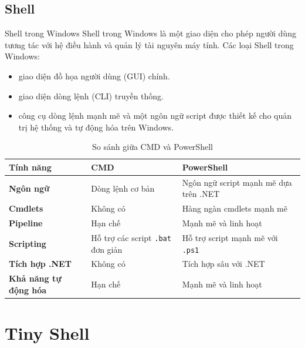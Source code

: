 \subsection{Shell}

\begin{frame}{Shell trong Windows}
Shell trong Windows là một giao diện cho phép người dùng tương tác với hệ điều hành và quản lý tài nguyên máy tính.
\vspace{5 pt}
Các loại Shell trong Windows:
\begin{itemize}
    \item {} giao diện đồ họa người dùng (GUI) chính.
    \item {} giao diện dòng lệnh (CLI) truyền thống.
    \item {} công cụ dòng lệnh mạnh mẽ và một ngôn ngữ script được thiết kế cho quản trị hệ thống và tự động hóa trên Windows. 
\end{itemize}
\end{frame}

\begin{frame}
\begin{table}[h]
\centering
\begin{tabular}{|>{\raggedright}m{2cm}|>{\raggedright\arraybackslash}m{3cm}|>{\raggedright\arraybackslash}m{3.5cm}|}
\hline
\textbf{Tính năng} & \textbf{CMD} & \textbf{PowerShell} \\ \hline
\textbf{Ngôn ngữ} & Dòng lệnh cơ bản & Ngôn ngữ script mạnh mẽ dựa trên .NET \\ \hline
\textbf{Cmdlets} & Không có & Hàng ngàn cmdlets mạnh mẽ \\ \hline
\textbf{Pipeline} & Hạn chế & Mạnh mẽ và linh hoạt \\ \hline
\textbf{Scripting} & Hỗ trợ các script \texttt{.bat} đơn giản & Hỗ trợ script mạnh mẽ với \texttt{.ps1} \\ \hline
\textbf{Tích hợp .NET} & Không có & Tích hợp sâu với .NET \\ \hline
\textbf{Khả năng tự động hóa} & Hạn chế & Mạnh mẽ và linh hoạt \\ \hline
\end{tabular}
\caption{So sánh giữa CMD và PowerShell}
\end{table}
\end{frame}

\section{Tiny Shell}

